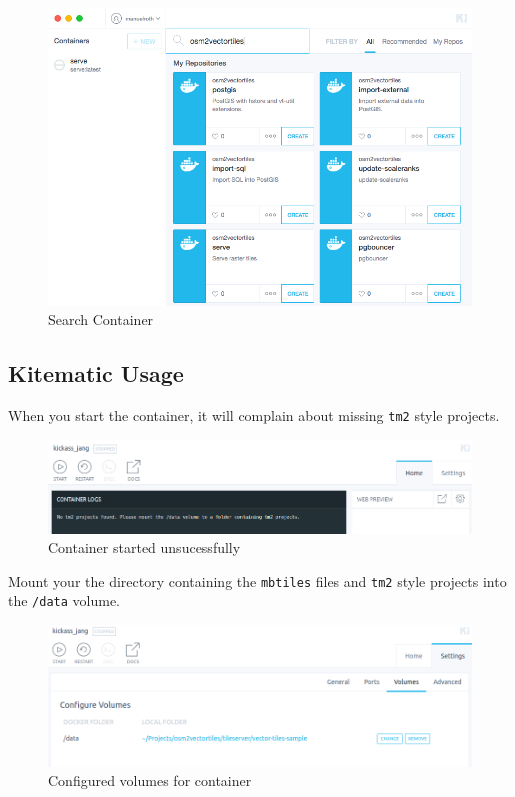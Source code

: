 \begin{figure}[H]
\centering
\includegraphics[width=1\textwidth]{images/search_container.png}
\caption{Search Container}
\end{figure}

\subsection{Kitematic Usage}\label{kitematic-usage}

When you start the container, it will complain about missing
\texttt{tm2} style projects.

\begin{figure}[H]
\centering
\includegraphics[width=1\textwidth]{images/tileserver_kitematic_started.png}
\caption{Container started unsucessfully}
\end{figure}

Mount your the directory containing the \texttt{mbtiles} files and
\texttt{tm2} style projects into the \texttt{/data} volume.

\begin{figure}[H]
\centering
\includegraphics[width=1\textwidth]{images/tileserver_kitematic_volumes_configured.png}
\caption{Configured volumes for container}
\end{figure}

